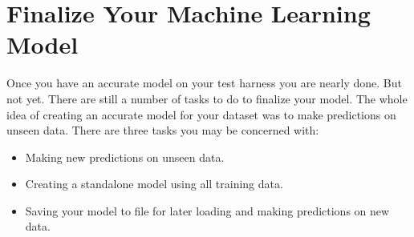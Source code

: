 \documentclass[
]{book}
\newenvironment{Shaded}{\begin{snugshade}}{\end{snugshade}}
\newcommand{\AttributeTok}[1]{\textcolor[rgb]{0.77,0.63,0.00}{#1}}
\newcommand{\CommentTok}[1]{\textcolor[rgb]{0.56,0.35,0.01}{\textit{#1}}}
\newcommand{\ConstantTok}[1]{\textcolor[rgb]{0.00,0.00,0.00}{#1}}
\newcommand{\DecValTok}[1]{\textcolor[rgb]{0.00,0.00,0.81}{#1}}
\newcommand{\FunctionTok}[1]{\textcolor[rgb]{0.00,0.00,0.00}{#1}}
\newcommand{\NormalTok}[1]{#1}
\newcommand{\OtherTok}[1]{\textcolor[rgb]{0.56,0.35,0.01}{#1}}
\newcommand{\SpecialCharTok}[1]{\textcolor[rgb]{0.00,0.00,0.00}{#1}}
\newcommand{\StringTok}[1]{\textcolor[rgb]{0.31,0.60,0.02}{#1}}
\providecommand{\tightlist}{%
  \setlength{\itemsep}{0pt}\setlength{\parskip}{0pt}}
\begin{document}
\hypertarget{finalize-your-machine-learning-model-1}{%
\section{Finalize Your Machine Learning Model}\label{finalize-your-machine-learning-model-1}}

Once you have an accurate model on your test harness you are nearly done. But not yet. There are still a number of tasks to do to finalize your model. The whole idea of creating an accurate model for your dataset was to make predictions on unseen data. There are three tasks you may be concerned with:

\begin{itemize}
\tightlist
\item
  Making new predictions on unseen data.
\item
  Creating a standalone model using all training data.
\item
  Saving your model to file for later loading and making predictions on new data.
\end{itemize}

\begin{Shaded}
\end{Shaded}
\end{document}
